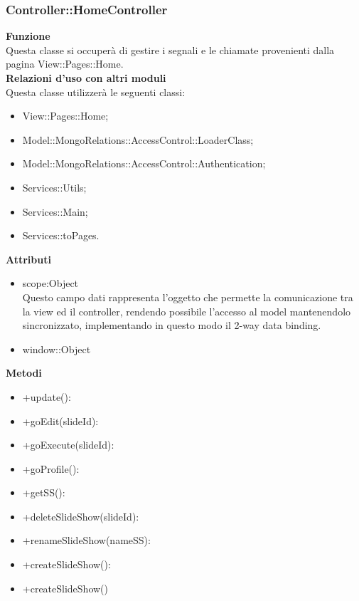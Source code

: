 {			\subsubsection{Controller::HomeController}{
					\label{sub:homecontroller}
					\textbf{Funzione}\\
					\indent Questa classe si occuperà di gestire i segnali e le chiamate provenienti dalla pagina View::Pages::Home.\\
					\textbf{Relazioni d'uso con altri moduli}\\
					\indent Questa classe utilizzerà le seguenti classi:
					\begin{itemize}
						\item View::Pages::Home;
						\item Model::MongoRelations::AccessControl::LoaderClass;
						\item Model::MongoRelations::AccessControl::Authentication;
						\item Services::Utils;
						\item Services::Main;
						\item Services::toPages.
					\end{itemize}
					\textbf{Attributi}\\
				    \begin{itemize}
					\item scope:Object\\
				    Questo campo dati rappresenta l’oggetto che permette la comunicazione tra la view ed il controller, rendendo possibile l’accesso al model mantenendolo sincronizzato, implementando in questo modo il 2-way data binding.
				    \item window::Object\\
					\end{itemize}
					\textbf{Metodi}
					\begin{itemize}
					\item +update():
					\item +goEdit(slideId):
					\item +goExecute(slideId):
					\item +goProfile():
					\item +getSS():
					\item +deleteSlideShow(slideId):
					\item +renameSlideShow(nameSS):
					\item +createSlideShow():
					\item +createSlideShow()
                    

\end{itemize}}}
